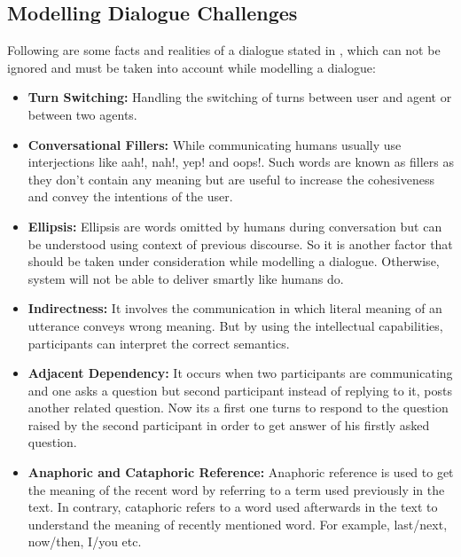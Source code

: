 \subsection{Modelling Dialogue Challenges}
Following are some facts and realities of a dialogue stated in \cite{dialoguemanagementsystems}, which can not be ignored and must be taken into account while modelling a dialogue: 
\begin{itemize}
\item \textbf{Turn Switching:} Handling the switching of turns between user and agent or between two agents. 
\item \textbf{Conversational Fillers:} While communicating humans usually use interjections like aah!, nah!, yep! and oops!. Such words are known as fillers as they don't contain any meaning but are useful to increase the cohesiveness and convey the intentions of the user.  
\item \textbf{Ellipsis:} Ellipsis are words omitted by humans during conversation but can be understood using context of previous discourse. So it is another factor that should be taken under consideration while modelling a dialogue. Otherwise, system will not be able to deliver smartly like humans do. 
\item \textbf{Indirectness:} It involves the communication in which literal meaning of an utterance conveys wrong meaning. But by using the intellectual capabilities, participants can interpret the correct semantics.
\item \textbf{Adjacent Dependency:} It occurs when two participants are communicating and one asks a question but second participant instead of replying to it, posts another related question. Now its a first one turns to respond to the question raised by the second participant in order to get answer of his firstly asked question. 
\item \textbf{Anaphoric and Cataphoric Reference:} Anaphoric reference is used to get the meaning of the recent word by referring to a term used previously in the text. In contrary, cataphoric refers to a word used afterwards in the text to understand the meaning of recently mentioned word. For example, last/next, now/then, I/you etc.
\end{itemize}

